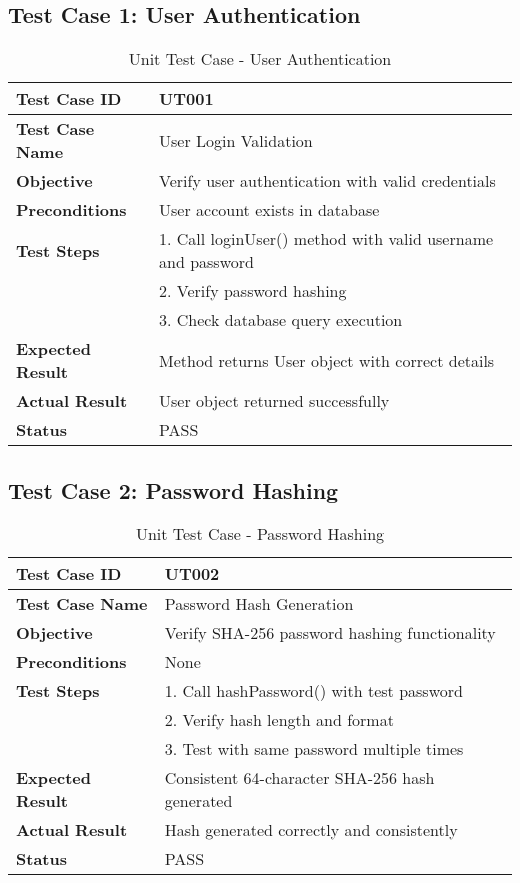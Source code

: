 \subsection{Test Case 1: User Authentication}
\begin{table}[h]
\centering
\begin{tabular}{|p{3cm}|p{10cm}|}
\hline
\textbf{Test Case ID} & UT001 \\
\hline
\textbf{Test Case Name} & User Login Validation \\
\hline
\textbf{Objective} & Verify user authentication with valid credentials \\
\hline
\textbf{Preconditions} & User account exists in database \\
\hline
\textbf{Test Steps} & 1. Call loginUser() method with valid username and password\\
& 2. Verify password hashing\\
& 3. Check database query execution \\
\hline
\textbf{Expected Result} & Method returns User object with correct details \\
\hline
\textbf{Actual Result} & User object returned successfully \\
\hline
\textbf{Status} & PASS \\
\hline
\end{tabular}
\caption{Unit Test Case - User Authentication}
\end{table}

\subsection{Test Case 2: Password Hashing}
\begin{table}[h]
\centering
\begin{tabular}{|p{3cm}|p{10cm}|}
\hline
\textbf{Test Case ID} & UT002 \\
\hline
\textbf{Test Case Name} & Password Hash Generation \\
\hline
\textbf{Objective} & Verify SHA-256 password hashing functionality \\
\hline
\textbf{Preconditions} & None \\
\hline
\textbf{Test Steps} & 1. Call hashPassword() with test password\\
& 2. Verify hash length and format\\
& 3. Test with same password multiple times \\
\hline
\textbf{Expected Result} & Consistent 64-character SHA-256 hash generated \\
\hline
\textbf{Actual Result} & Hash generated correctly and consistently \\
\hline
\textbf{Status} & PASS \\
\hline
\end{tabular}
\caption{Unit Test Case - Password Hashing}
\end{table}

